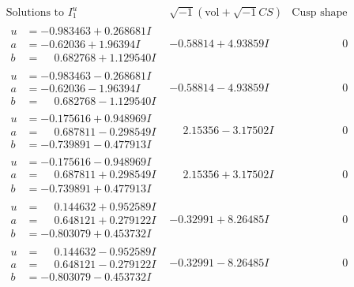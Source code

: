 \documentclass[1p]{elsarticle_modified}
\theoremstyle{definition}
\newcommand{\I}{\sqrt{-1}}
\begin{document}
$$\begin{array}{c|c|c}  
\text{Solutions to }I^u_{1}& \I (\text{vol} + \sqrt{-1}CS) & \text{Cusp shape}\\
 \hline 
\begin{aligned}
u &= -0.983463 + 0.268681 I \\
a &= -0.62036 + 1.96394 I \\
b &= \phantom{-}0.682768 + 1.129540 I\end{aligned}
 & -0.58814 + 4.93859 I & \phantom{-0.000000 } 0 \\ \hline\begin{aligned}
u &= -0.983463 - 0.268681 I \\
a &= -0.62036 - 1.96394 I \\
b &= \phantom{-}0.682768 - 1.129540 I\end{aligned}
 & -0.58814 - 4.93859 I & \phantom{-0.000000 } 0 \\ \hline\begin{aligned}
u &= -0.175616 + 0.948969 I \\
a &= \phantom{-}0.687811 - 0.298549 I \\
b &= -0.739891 - 0.477913 I\end{aligned}
 & \phantom{-}2.15356 - 3.17502 I & \phantom{-0.000000 } 0 \\ \hline\begin{aligned}
u &= -0.175616 - 0.948969 I \\
a &= \phantom{-}0.687811 + 0.298549 I \\
b &= -0.739891 + 0.477913 I\end{aligned}
 & \phantom{-}2.15356 + 3.17502 I & \phantom{-0.000000 } 0 \\ \hline\begin{aligned}
u &= \phantom{-}0.144632 + 0.952589 I \\
a &= \phantom{-}0.648121 + 0.279122 I \\
b &= -0.803079 + 0.453732 I\end{aligned}
 & -0.32991 + 8.26485 I & \phantom{-0.000000 } 0 \\ \hline\begin{aligned}
u &= \phantom{-}0.144632 - 0.952589 I \\
a &= \phantom{-}0.648121 - 0.279122 I \\
b &= -0.803079 - 0.453732 I\end{aligned}
 & -0.32991 - 8.26485 I & \phantom{-0.000000 } 0 \\ \hline\begin{aligned}

\end{aligned}
\end{array}$$
\end{document}
